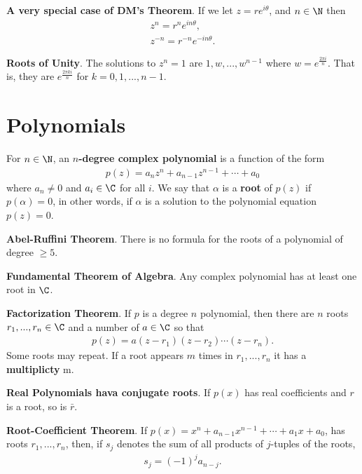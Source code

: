 \documentclass{article}
\begin{document}
\begin{theorem}
    \textbf{A very special case of DM's Theorem}. If we let $z=re^{i\theta}$, and $n\in\N$ then
    \begin{align*}
        z^n = r^ne^{in\theta}, \\
        z^{-n} = r^{-n}e^{-in\theta}.
    \end{align*}
\end{theorem}
\begin{theorem}
    \textbf{Roots of Unity}. The solutions to $z^n=1$ are $1,w,...,w^{n-1}$ where $w=e^{\frac{2\pi i}{n}}$. That is, they are $e^{\frac{2\pi ki}{n}}$ for $k=0,1,...,n-1$.
\end{theorem}
\section{Polynomials}
\begin{definition}
    For $n\in\N$, an \textbf{$n$-degree complex polynomial} is a function of the form
    \begin{align*}
        p(z)=a_nz^n+a_{n-1}z^{n-1}+\cdots+a_0
    \end{align*}
    where $a_n\not=0$ and $a_i\in\C$ for all $i$. We say that $\alpha$ is a \textbf{root} of $p(z)$ if $p(\alpha)=0$, in other words, if $\alpha$ is a solution to the polynomial equation $p(z)=0$.
\end{definition}
\begin{theorem}
    \textbf{Abel-Ruffini Theorem}. There is no formula for the roots of a polynomial of degree $\geq 5$.
\end{theorem}
\begin{theorem}
    \textbf{Fundamental Theorem of Algebra}. Any complex polynomial has at least one root in $\C$.
\end{theorem}
\begin{theorem}
    \textbf{Factorization Theorem}. If $p$ is a degree $n$ polynomial, then there are $n$ roots $r_1,...,r_n\in\C$ and a number of $a\in\C$ so that
    \begin{align*}
        p(z)=a(z-r_1)(z-r_2)\cdots(z-r_n).
    \end{align*}
    Some roots may repeat. If a root appears $m$ times in $r_1, ..., r_n$ it has a \textbf{multiplicty} m.
\end{theorem}
\begin{theorem}
    \textbf{Real Polynomials hava conjugate roots}. If $p(x)$ has real coefficients and $r$ is a root, so is $\bar{r}$.
\end{theorem}
\begin{theorem}
    \textbf{Root-Coefficient Theorem}. If $p(x)=x^n+a_{n-1}x^{n-1}+\cdots+a_1x+a_0$, has roots $r_1, ..., r_n$, then, if $s_j$ denotes the sum of all products of $j$-tuples of the roots,
    \begin{align*}
        s_j=(-1)^ja_{n-j}.
    \end{align*}
\end{theorem}
\end{document}

